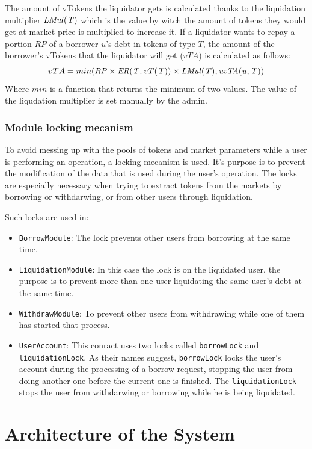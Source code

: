 The amount of vTokens the liquidator gets is calculated thanks to the liquidation multiplier $\mathit{LMul(T)}$ which is the value by witch the amount of tokens they would get at market price is multiplied to increase it. If a liquidator wants to repay a portion $\mathit{RP}$ of a borrower $u$'s debt in tokens of type $T$, the amount of the borrower's vTokens that the liquidator will get ($vTA$) is calculated as follows:
$$
  vTA = min(\mathit{RP} \times \mathit{ER(T, \mathit{vT(T)})} \times \mathit{LMul(T)}, \mathit{uvTA(u, T)})
$$
Where $min$ is a function that returns the minimum of two values. The value of the liqudation multiplier is set manually by the admin.

\subsubsection{Module locking mecanism}

To avoid messing up with the pools of tokens and market parameters while a user is performing an operation, a locking mecanism is used. It's purpose is to prevent the modification of the data that is used during the user's operation. The locks are especially necessary when trying to extract tokens from the markets by borrowing or withdarwing, or from other users through liquidation.

Such locks are used in:
\begin{itemize}
  \item \verb|BorrowModule|: The lock prevents other users from borrowing at the same time.
  \item \verb|LiquidationModule|: In this case the lock is on the liquidated user, the purpose is to prevent more than one user liquidating the same user's debt at the same time.
  \item \verb|WithdrawModule|: To prevent other users from withdrawing while one of them has started that process.
  \item \verb|UserAccount|: This conract uses two locks called \verb|borrowLock| and \verb|liquidationLock|. As their names suggest, \verb|borrowLock| locks the user's account during the processing of a borrow request, stopping the user from doing another one before the current one is finished. The \verb|liquidationLock| stops the user from withdarwing or borrowing while he is being liquidated.
\end{itemize}

\section{Architecture of the System}

